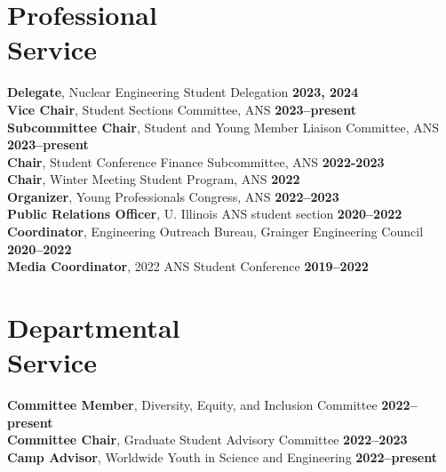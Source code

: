\documentclass[margin,line]{resume}
\begin{document}
\begin{resume}
    \section{\mysidestyle Professional\\Service}
    \textbf{Delegate}, Nuclear Engineering Student Delegation \hfill \textbf{2023, 2024}\vspace{.5mm}\\%
    \textbf{Vice Chair}, Student Sections Committee, ANS \hfill \textbf{2023--present}\vspace{.5mm}\\%
    \textbf{Subcommittee Chair}, Student and Young Member Liaison Committee, ANS \hfill \textbf{2023--present}\vspace{.5mm}\\%
    \textbf{Chair}, Student Conference Finance Subcommittee, ANS \hfill \textbf{2022-2023}\vspace{.5mm}\\%
                \textbf{Chair}, Winter Meeting Student Program, ANS \hfill \textbf{2022}\vspace{.5mm}\\%
    \textbf{Organizer}, Young Professionals Congress, ANS \hfill \textbf{2022--2023}\vspace{.5mm}\\%
                \textbf{Public Relations Officer}, U. Illinois ANS student section  \hfill \textbf{2020--2022}\vspace{.5mm}\\%
    \textbf{Coordinator}, Engineering Outreach Bureau, Grainger Engineering Council \hfill \textbf{2020--2022}\vspace{.5mm}\\%
                \textbf{Media Coordinator}, 2022 ANS Student Conference \hfill \textbf{2019--2022}\vspace{.5mm}\\%
    \section{\mysidestyle Departmental\\Service}
                \textbf{Committee Member}, Diversity, Equity, and Inclusion Committee \hfill \textbf{2022--present}\vspace{.5mm}\\%
                \textbf{Committee Chair}, Graduate Student Advisory Committee \hfill \textbf{2022--2023}\vspace{.5mm}\\%
                \textbf{Camp Advisor}, Worldwide Youth in Science and Engineering \hfill \textbf{2022--present}\vspace{.5mm}\\%


\end{resume}
\end{document}

